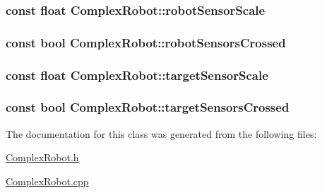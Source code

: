 \hypertarget{classComplexRobot_ac433b802cfc866917bc32680357e0b3e}{
\subsubsection[{robot\-Sensor\-Scale}]{\setlength{\rightskip}{0pt plus 5cm}const float Complex\-Robot\-::robot\-Sensor\-Scale}}\label{classComplexRobot_ac433b802cfc866917bc32680357e0b3e}
\hypertarget{classComplexRobot_a329fa033f98c4611fc6fd08f1ec0c1a2}{
\subsubsection[{robot\-Sensors\-Crossed}]{\setlength{\rightskip}{0pt plus 5cm}const bool Complex\-Robot\-::robot\-Sensors\-Crossed}}\label{classComplexRobot_a329fa033f98c4611fc6fd08f1ec0c1a2}
\hypertarget{classComplexRobot_a95cae4898e63c23418684c87e6ab0176}{
\subsubsection[{target\-Sensor\-Scale}]{\setlength{\rightskip}{0pt plus 5cm}const float Complex\-Robot\-::target\-Sensor\-Scale}}\label{classComplexRobot_a95cae4898e63c23418684c87e6ab0176}
\hypertarget{classComplexRobot_ac7fa0582f9c586b38c1dc73382a1c5a9}{
\subsubsection[{target\-Sensors\-Crossed}]{\setlength{\rightskip}{0pt plus 5cm}const bool Complex\-Robot\-::target\-Sensors\-Crossed}}\label{classComplexRobot_ac7fa0582f9c586b38c1dc73382a1c5a9}


The documentation for this class was generated from the following files\-:\begin{DoxyCompactItemize}
\item 
\hyperlink{ComplexRobot_8h}{Complex\-Robot.\-h}\item 
\hyperlink{ComplexRobot_8cpp}{Complex\-Robot.\-cpp}\end{DoxyCompactItemize}
